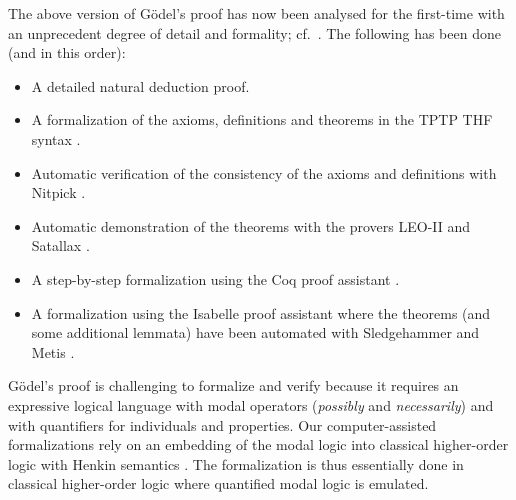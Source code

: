 \documentclass{llncs}
\newcommand{\imp}{\rightarrow}
\newcommand{\all}{\forall}
\newcommand{\ex}{\exists}
\newcommand{\nec}{\Box} %
\newcommand{\pos}{\Diamond} %
\newcommand{\ess}[2]{#1 \ \mathit{Ess.} \ #2}
\begin{document}

The above version of G\"{o}del's proof has now been 
analysed for the first-time
with an unprecedent degree of detail and formality; cf.~\cite{FormalTheologyRepository}. The following has been done (and in this order):
\begin{itemize}
\item A detailed natural deduction proof.
%
\item A formalization of the axioms, definitions and theorems in the TPTP THF syntax \cite{J22}.
%
\item Automatic verification of the consistency of the axioms and 
definitions with Nitpick \cite{Nitpick}.
%
\item Automatic demonstration of the theorems with the provers LEO-II \cite{LEO-II} and Satallax \cite{Satallax}.

\item A step-by-step formalization using the Coq proof assistant \cite{Coq}.

\item A formalization using the Isabelle proof assistant \cite{Isabelle} where the theorems (and some additional lemmata) have been automated with Sledgehammer \cite{Sledgehammer} and Metis \cite{Hurd03first-orderproof}.
\end{itemize}

G\"{o}del's proof is challenging to formalize and verify because it
requires an expressive logical language with modal operators
(\emph{possibly} and \emph{necessarily}) and with
quantifiers for individuals and properties.  Our computer-assisted formalizations rely on an
embedding of the modal logic into classical higher-order logic with
Henkin semantics \cite{J23,B9}. The formalization is thus essentially
done in classical higher-order logic where  quantified modal logic is
emulated.
\end{document}
